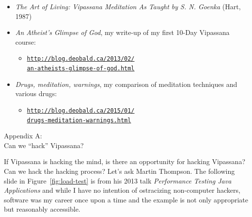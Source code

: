\documentclass{article}
\begin{document}
\begin{itemize}
\item \textit{The Art of Living: Vipassana Meditation As Taught by S. N. Goenka} (Hart, 1987)
\item \textit{An Atheist's Glimpse of God}, my write-up of my first 10-Day Vipassana course:
  \begin{itemize}
  \item \href{http://blog.deobald.ca/2013/02/an-atheists-glimpse-of-god.html}
             {\nolinkurl{http://blog.deobald.ca/2013/02/}}\\
        \href{http://blog.deobald.ca/2013/02/an-atheists-glimpse-of-god.html}
             {\nolinkurl{an-atheists-glimpse-of-god.html}}
  \end{itemize}
\item \textit{Drugs, meditation, warnings}, my comparison of meditation techniques and various drugs:
  \begin{itemize}
  \item \href{http://blog.deobald.ca/2015/01/drugs-meditation-warnings.html}
             {\nolinkurl{http://blog.deobald.ca/2015/01/}}\\
        \href{http://blog.deobald.ca/2015/01/drugs-meditation-warnings.html}
             {\nolinkurl{drugs-meditation-warnings.html}}
  \end{itemize}
\end{itemize}

\pagebreak

\begin{center}
  \Huge{Appendix A:}\\
  \Huge{Can we ``hack'' Vipassana?}
\end{center}

If Vipassana is hacking the mind, is there an opportunity for hacking Vipassana? Can we hack the hacking process? Let's ask Martin Thompson. The following slide in Figure~\ref{fig:load-test} is from his 2013 talk \textit{Performance Testing Java Applications} \cite{testingjava} and while I have no intention of ostracizing non-computer hackers, software was my career once upon a time and the example is not only appropriate but reasonably accessible.
\end{document}
